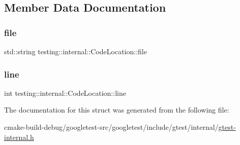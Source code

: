 \subsection{Member Data Documentation}
\mbox{\label{structtesting_1_1internal_1_1CodeLocation_a38118056ad3c11359920274e393bc6b3}} 
\subsubsection{\texorpdfstring{file}{file}}
{\footnotesize\ttfamily std\+::string testing\+::internal\+::\+Code\+Location\+::file}

\mbox{\label{structtesting_1_1internal_1_1CodeLocation_a01c977c7e8834a05a6d6c40b0c416045}} 
\subsubsection{\texorpdfstring{line}{line}}
{\footnotesize\ttfamily int testing\+::internal\+::\+Code\+Location\+::line}



The documentation for this struct was generated from the following file\+:\begin{DoxyCompactItemize}
\item 
cmake-\/build-\/debug/googletest-\/src/googletest/include/gtest/internal/\mbox{\hyperlink{gtest-internal_8h}{gtest-\/internal.\+h}}\end{DoxyCompactItemize}
